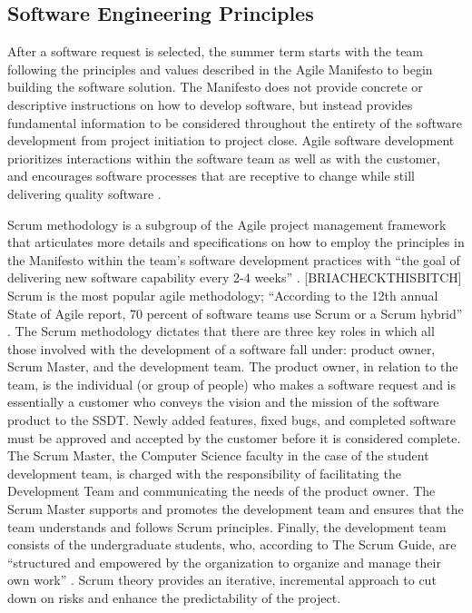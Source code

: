 \subsection{Software Engineering Principles}
After a software request is selected, the summer term starts with the team following the principles and values described in the Agile Manifesto to begin building the software solution. The Manifesto does not provide concrete or descriptive instructions on how to develop software, but instead provides fundamental information to be considered throughout the entirety of the software development from project initiation to project close. Agile software development prioritizes interactions within the software team as well as with the customer, and encourages software processes that are receptive to change while still delivering quality software \cite{agilemanifesto}. %

Scrum methodology is a subgroup of the Agile project management framework that articulates more details and specifications on how to employ the principles in the Manifesto within the team's software development practices with ``the goal of delivering new software capability every 2-4 weeks'' \cite{thescrumguide}. [BRIACHECKTHISBITCH] Scrum is the most popular agile methodology; ``According to the 12th annual State of Agile report, 70 percent of software teams use Scrum or a Scrum hybrid'' \cite{}. The Scrum methodology dictates that there are three key roles in which all those involved with the development of a software fall under: product owner, Scrum Master, and the development team. The product owner, in relation to the team, is the individual (or group of people) who makes a software request and is essentially a customer who conveys the vision and the mission of the software product to the SSDT. Newly added features, fixed bugs, and completed software must be approved and accepted by the customer before it is considered complete. The Scrum Master, the Computer Science faculty in the case of the student development team, is charged with the responsibility of facilitating the Development Team and communicating the needs of the product owner. The Scrum Master supports and promotes the development team and ensures that the team understands and follows Scrum principles. Finally, the development team consists of the undergraduate students, who, according to The Scrum Guide, are ``structured and empowered by the organization to organize and manage their own work'' \cite{}. Scrum theory provides an iterative, incremental approach to cut down on risks and enhance the predictability of the project. 


